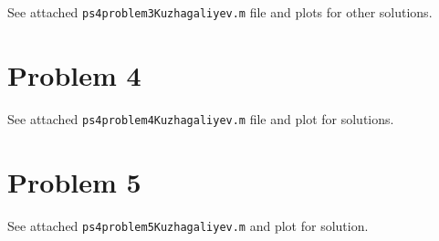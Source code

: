 \documentclass[10pt,letter]{article}
\begin{document}
See attached \texttt{ps4problem3Kuzhagaliyev.m} file and plots for other solutions.

\section*{Problem 4}

See attached \texttt{ps4problem4Kuzhagaliyev.m} file and plot for solutions.

\section*{Problem 5}

See attached \texttt{ps4problem5Kuzhagaliyev.m} and plot for solution.
\end{document}
